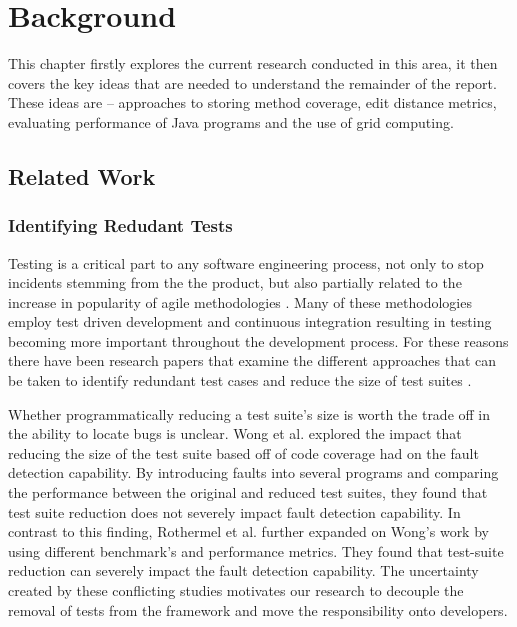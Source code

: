 \chapter{Background}\label{C:related}

This chapter firstly explores the current research conducted in this area, it then covers the key ideas that are needed to understand the remainder of the report. These ideas are -- approaches to storing method coverage, edit distance metrics, evaluating performance of Java programs and the use of grid computing.

\section{Related Work}
\label{relatedworkRef}
\subsection{Identifying Redudant Tests}
Testing is a critical part to any software engineering process, not only to stop incidents stemming from the the product, but also partially related to the increase in popularity of agile methodologies \cite{chaos}. Many of these methodologies employ test driven development and continuous integration resulting in testing becoming more important throughout the development process. For these reasons there have been research papers that examine the different approaches that can be taken to identify redundant test cases and reduce the size of test suites \cite{wong1995effect, wong1999test, rothermel1998empirical, rothermel2002empirical,koochakzadeh2009test,zhang2011empirical,li2008static}.

Whether programmatically reducing a test suite's size is worth the trade off in the ability to locate bugs is unclear.  Wong et al. \cite{wong1995effect, wong1999test} explored the impact that reducing the size of the test suite based off of code coverage had on the fault detection capability. By introducing faults into several programs and comparing the performance between the original and reduced test suites, they found that test suite reduction does not severely impact fault detection capability. In contrast to this finding, Rothermel et al. \cite{rothermel1998empirical, rothermel2002empirical} further expanded on Wong's work by using different benchmark's and performance metrics. They found that test-suite reduction can severely impact the fault detection capability. The uncertainty created by these conflicting studies motivates our research to decouple the removal of tests from the framework and move the responsibility onto developers. 

